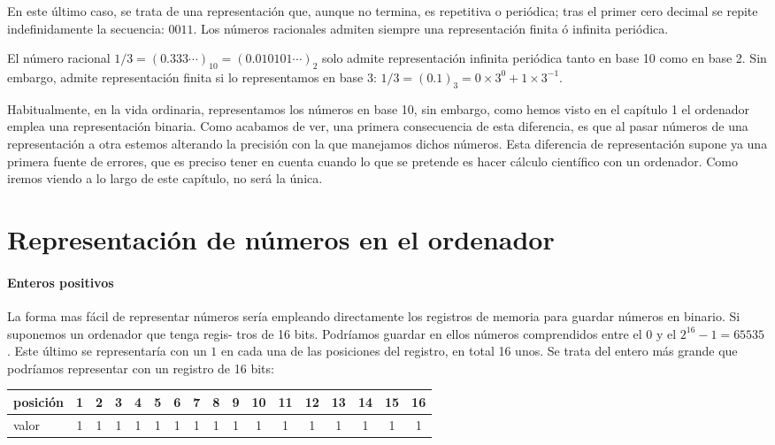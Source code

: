 En este último caso, se trata de una representación que, aunque no termina, es repetitiva o periódica; tras el primer cero decimal se repite indefinidamente la secuencia: $0011$. Los números racionales admiten siempre una representación finita ó infinita periódica. 

El número racional $1/3=(0.333\cdots)_{10}=(0.010101\cdots)_2$ solo admite representación infinita periódica tanto en base 10 como en base 2. Sin embargo, admite representación finita si lo representamos en base 3: $1/3=(0.1)_3=0\times3^0+1\times3^{-1}$.

Habitualmente, en la vida ordinaria, representamos los números en base 10, sin embargo, como hemos visto en el capítulo 1 el ordenador emplea una representación binaria. Como acabamos de ver, una primera consecuencia de esta diferencia, es que al pasar números de una representación a otra estemos alterando la precisión con la que manejamos dichos números. Esta diferencia de representación supone ya una primera fuente de errores, que es preciso tener en cuenta cuando lo que se pretende es hacer cálculo científico con un ordenador. Como iremos viendo a lo largo de este capítulo, no será la única.

\section{Representación de números en el ordenador}
\paragraph{Enteros positivos} La forma mas fácil de representar números sería empleando directamente los registros de memoria para guardar números en binario.  Si suponemos un ordenador que tenga regis-\- tros de 16 bits. Podríamos guardar en ellos números comprendidos entre el $0$ y el $2^{16}-1=65535$. Este último se representaría con un $1$ en cada una de las posiciones del registro, en total 16 unos. Se trata del entero más grande que podríamos representar con un registro de 16 bits:
\\

\begin{tabular}{|l|c|c|c|c|c|c|c|c|c|c|c|c|c|c|c|c|}
\hline
posición&1&2&3&4&5&6&7&8&9&10&11&12&13&14&15&16  \\
\hline
valor&1&1&1&1&1&1&1&1&1&1&1&1&1&1&1&1 \\
\hline
\end{tabular}\\

